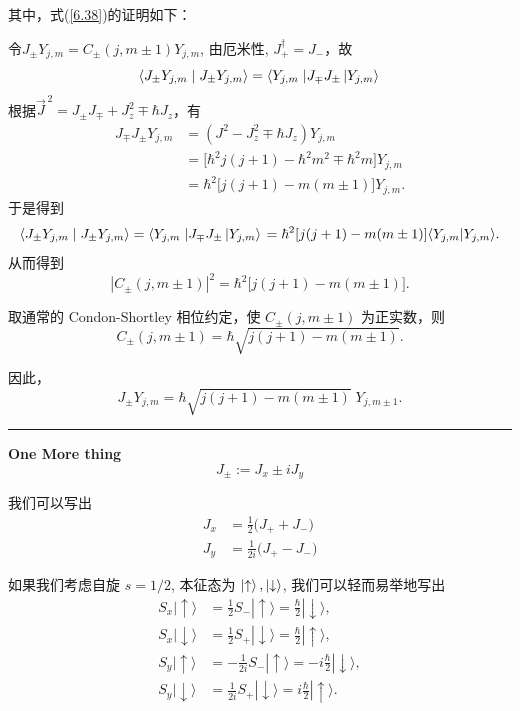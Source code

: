 其中，式(\ref{6.38})的证明如下：
\begin{proof*}
	令\(J_{\pm} Y_{j,m}=C_{\pm}(j,m \pm 1)Y_{j,m}\), 由厄米性, $J_+^\dagger = J_-$，故
	\[
	\left\langle {{{J_ \pm }{Y_{j,m}}}}
	\mathrel{\left | {\vphantom {{{J_ \pm }{Y_{j,m}}} {{J_ \pm }{Y_{j,m}}}}}
		\right. \kern-\nulldelimiterspace}
	{{{J_ \pm }{Y_{j,m}}}} \right\rangle  = \left\langle {{Y_{j,m}}} \right.\left| {{J_ \mp }{J_ \pm }\left| {{Y_{j,m}}} \right\rangle } \right.
	\]
	根据\(\vec{J}^{\,2} = J_\pm J_\mp + J_z^2 \mp \hbar J_z\)，有
	\begin{align*}
		J_{\mp} J_{\pm} Y_{j,m} &= (J^2 - J_z^2 \mp \hbar J_z) Y_{j,m} \\
		&= \bigl[ \hbar^2 j(j+1) - \hbar^2 m^2 \mp \hbar^2 m \bigr] Y_{j,m} \\
		&= \hbar^2 \bigl[ j(j+1) - m(m\pm 1) \bigr] Y_{j,m}.
	\end{align*}
	于是得到
	\[\left\langle {{{J_ \pm }{Y_{j,m}}}}
	\mathrel{\left | {\vphantom {{{J_ \pm }{Y_{j,m}}} {{J_ \pm }{Y_{j,m}}}}}
		\right. \kern-\nulldelimiterspace}
	{{{J_ \pm }{Y_{j,m}}}} \right\rangle  = \left\langle {{Y_{j,m}}} \right.\left| {{J_ \mp }{J_ \pm }\left| {{Y_{j,m}}} \right\rangle } \right. = {\hbar ^2}[j(j + 1) - m(m \pm 1)]\langle {Y_{j,m}}|{Y_{j,m}}\rangle .\]
	从而得到
	\[
	|C_{\pm}(j,m \pm 1)|^2 = \hbar^2 \bigl[ j(j+1) - m(m\pm 1) \bigr].
	\]
	
	取通常的 Condon-Shortley 相位约定，使 $C_{\pm}(j,m \pm 1)$ 为正实数，则
	\[
	C_{\pm}(j,m \pm 1) = \hbar \sqrt{ j(j+1) - m(m\pm 1) }.
	\]
	
	因此，
	\[
	\boxed{ J_{\pm} Y_{j,m} = \hbar \sqrt{ j(j+1) - m(m\pm 1) } \; Y_{j,m\pm 1} }.
	\]
\end{proof*}
\noindent\rule{\textwidth}{0.4pt}  %

\textbf{One More thing}
\[
J_\pm := J_x \pm i J_y
\]

我们可以写出
\[
\boxed{
	\begin{aligned}
		J_x &= \frac{1}{2} \bigl( J_{+} + J_{-} \bigr) \\
		J_y &= \frac{1}{2i} \bigl( J_{+} - J_{-} \bigr)
	\end{aligned}
}
\]

如果我们考虑自旋 $s=1/2$, 本征态为 \(\ket{\uparrow},\ket{\downarrow}\), 我们可以轻而易举地写出
\[
\begin{aligned}
	S_x |\! \uparrow \rangle &= \frac{1}{2} S_{-} |\! \uparrow \rangle = \frac{\hbar}{2} |\! \downarrow \rangle, \\[4pt]
	S_x |\! \downarrow \rangle &= \frac{1}{2} S_{+} |\! \downarrow \rangle = \frac{\hbar}{2} |\! \uparrow \rangle, \\[6pt]
	S_y |\! \uparrow \rangle &= -\frac{1}{2i} S_{-} |\! \uparrow \rangle = -i\frac{\hbar}{2} |\! \downarrow \rangle, \\[4pt]
	S_y |\! \downarrow \rangle &= \frac{1}{2i} S_{+} |\! \downarrow \rangle = i\frac{\hbar}{2} |\! \uparrow \rangle .
\end{aligned}
\]

